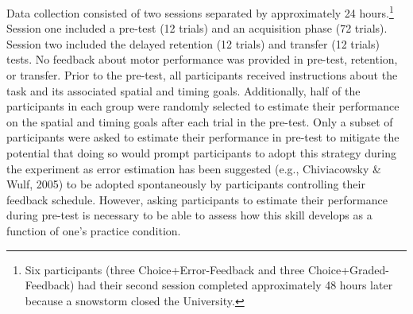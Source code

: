 \documentclass[
  doc, donotrepeattitle,floatsintext]{apa7}
\begin{document}
Data collection consisted of two sessions separated by approximately 24 hours.\footnote{Six participants (three Choice+Error-Feedback and three Choice+Graded-Feedback) had their second session completed approximately 48 hours later because a snowstorm closed the University.} Session one included a pre-test (12 trials) and an acquisition phase (72 trials). Session two included the delayed retention (12 trials) and transfer (12 trials) tests. No feedback about motor performance was provided in pre-test, retention, or transfer. Prior to the pre-test, all participants received instructions about the task and its associated spatial and timing goals. Additionally, half of the participants in each group were randomly selected to estimate their performance on the spatial and timing goals after each trial in the pre-test. Only a subset of participants were asked to estimate their performance in pre-test to mitigate the potential that doing so would prompt participants to adopt this strategy during the experiment as error estimation has been suggested (e.g., Chiviacowsky \& Wulf, 2005) to be adopted spontaneously by participants controlling their feedback schedule. However, asking participants to estimate their performance during pre-test is necessary to be able to assess how this skill develops as a function of one's practice condition.
\end{document}
